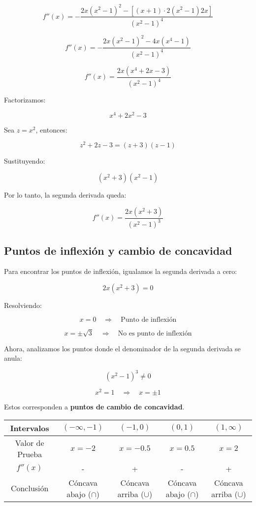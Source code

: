 \[
f''(x) = - \frac{2x (x^2 -1)^2 - \left[ (x+1) \cdot 2 (x^2 -1) 2x \right]}{(x^2 -1)^4}
\]

\[
f''(x) = - \frac{2x (x^2-1)^2 - 4x (x^4 -1)}{(x^2 -1)^4}
\]

\[
f''(x) = \frac{2x(x^4 + 2x -3)}{(x^2 - 1)^4}
\]

Factorizamos:

\[
x^4 + 2x^2 -3
\]

Sea \( z = x^2 \), entonces:

\[
z^2 + 2z -3 = (z+3)(z-1)
\]

Sustituyendo:

\[
(x^2+3)(x^2-1)
\]

Por lo tanto, la segunda derivada queda:

\[
f''(x) = \frac{2x (x^2+3)}{(x^2 -1)^3}
\]

\subsection*{Puntos de inflexión y cambio de concavidad}

Para encontrar los puntos de inflexión, igualamos la segunda derivada a cero:

\[
2x(x^2+3) = 0
\]

Resolviendo:

\[
x = 0 \quad \Rightarrow \quad \text{Punto de inflexión}
\]

\[
x = \pm \sqrt{3} \quad \Rightarrow \quad \text{No es punto de inflexión}
\]

Ahora, analizamos los puntos donde el denominador de la segunda derivada se anula:

\[
(x^2 -1)^3 \neq 0
\]

\[
x^2 = 1 \quad \Rightarrow \quad x = \pm 1
\]

Estos corresponden a \textbf{puntos de cambio de concavidad}.

\begin{center}
    \begin{tabular}{|c|c|c|c|c|}
        \hline
        Intervalos & $(-\infty,-1)$ & $(-1,0)$ & $(0,1)$ & $(1,\infty)$ \\
        \hline
        Valor de Prueba & $x=-2$ & $x=-0.5$ & $x=0.5$ & $x=2$ \\
        \hline
        $f''(x)$ & - & + & - & + \\
        \hline
        Conclusión & Cóncava abajo ($\cap$) & Cóncava arriba ($\cup$) & Cóncava abajo ($\cap$) & Cóncava  arriba ($\cup$) \\
        \hline
    \end{tabular}
\end{center}

